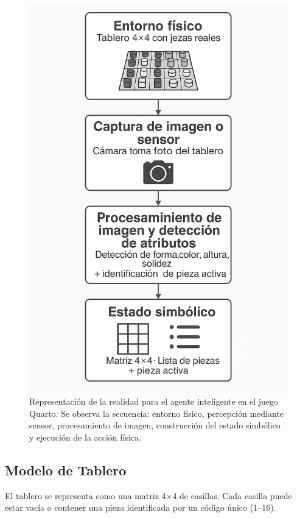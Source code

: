 \documentclass[conference]{IEEEtran}
\begin{document}
\begin{figure}[h!]
	\centering
	\includegraphics[width=0.95\linewidth]{img/representacion-realidad.png}
	\caption{Representación de la realidad para el agente inteligente en el juego Quarto. Se observa la secuencia: entorno físico, percepción mediante sensor, procesamiento de imagen, construcción del estado simbólico y ejecución de la acción física.}
	\label{fig:representacion_realidad}
\end{figure}

	\subsection{Modelo de Tablero}
	El tablero se representa como una matriz 4×4 de casillas. Cada casilla puede estar vacía o contener una pieza identificada por un código único (1–16).
\end{document}
